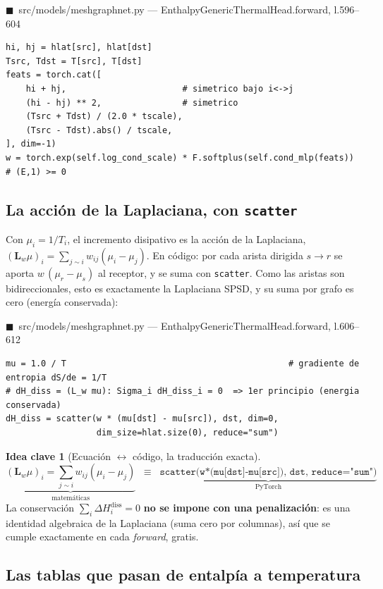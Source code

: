 \documentclass[11pt]{article}
\newcommand{\Lw}{\bm{L}_{w}}
\theoremstyle{definition}
\newtheorem{idea}{Idea clave}[section]
\theoremstyle{plain}
\newcommand{\srcref}[1]{\par\smallskip\noindent
  {\footnotesize\ttfamily\textcolor{srcblue}{$\blacksquare$\ #1}}\par\vspace{1pt}}
\begin{document}
\srcref{src/models/meshgraphnet.py — EnthalpyGenericThermalHead.forward, l.596--604}
\begin{lstlisting}
hi, hj = hlat[src], hlat[dst]
Tsrc, Tdst = T[src], T[dst]
feats = torch.cat([
    hi + hj,                       # simetrico bajo i<->j
    (hi - hj) ** 2,                # simetrico
    (Tsrc + Tdst) / (2.0 * tscale),
    (Tsrc - Tdst).abs() / tscale,
], dim=-1)
w = torch.exp(self.log_cond_scale) * F.softplus(self.cond_mlp(feats))   # (E,1) >= 0
\end{lstlisting}

\subsection{La acción de la Laplaciana, con \texttt{scatter}}

Con $\mu_i=1/T_i$, el incremento disipativo es la acción de la Laplaciana,
$(\Lw\mu)_i=\sum_{j\sim i}w_{ij}(\mu_i-\mu_j)$. En código: por cada arista dirigida
$s\!\rightarrow\!r$ se aporta $w\,(\mu_r-\mu_s)$ al receptor, y se suma con
\texttt{scatter}. Como las aristas son bidireccionales, esto es exactamente la
Laplaciana SPSD, y su suma por grafo es cero (energía conservada):

\srcref{src/models/meshgraphnet.py — EnthalpyGenericThermalHead.forward, l.606--612}
\begin{lstlisting}
mu = 1.0 / T                                            # gradiente de entropia dS/de = 1/T
# dH_diss = (L_w mu): Sigma_i dH_diss_i = 0  => 1er principio (energia conservada)
dH_diss = scatter(w * (mu[dst] - mu[src]), dst, dim=0,
                  dim_size=hlat.size(0), reduce="sum")
\end{lstlisting}

\begin{idea}[Ecuación $\leftrightarrow$ código, la traducción exacta]
\[
\underbrace{(\Lw\mu)_i=\!\!\sum_{j\sim i}\!w_{ij}(\mu_i-\mu_j)}_{\text{matemáticas}}
\;\;\equiv\;\;
\underbrace{\texttt{scatter(w*(mu[dst]-mu[src]), dst, reduce="sum")}}_{\text{PyTorch}}
\]
La conservación $\sum_i\Delta H_i^{\mathrm{diss}}=0$ \textbf{no se impone con una
penalización}: es una identidad algebraica de la Laplaciana (suma cero por columnas),
así que se cumple exactamente en cada \emph{forward}, gratis.
\end{idea}

\subsection{Las tablas que pasan de entalpía a temperatura}
\end{document}
